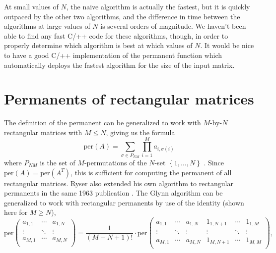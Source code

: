 \documentclass{article}
\begin{document}
At small values of $N$, the naive algorithm is actually the fastest, but it is quickly outpaced by
the other two algorithms, and the difference in time between the algorithms at large values of $N$
is several orders of magnitude. We haven't been able to find any fast C/++ code for these
algorithms, though, in order to properly determine which algorithm is best at which values of $N$.
It would be nice to have a good C/++ implementation of the permanent function which automatically
deploys the fastest algorithm for the size of the input matrix.

\section*{Permanents of rectangular matrices}

The definition of the permanent can be generalized to work with $M$-by-$N$ rectangular
matrices with $M \leq N$, giving us the formula
\begin{equation} \label{eq:rectper1}
    \text{per}(A) = \sum_{\sigma \in P_{NM}}{\prod_{i=1}^M{a_{i,{\sigma(i)}}}}
\end{equation}
where $P_{NM}$ is the set of $M$-permutations of the $N$-set $\left\{1,\dots,N\right\}$
\cite{wiki:permanent}.  Since $\text{per}(A) = \text{per}(A^T)$, this is sufficient for computing
the permanent of all rectangular matrices. Ryser also extended his own algorithm to rectangular
permanents in the same 1963 publication \cite{wiki:computing,ryser1963}.
The Glynn algorithm can be generalized to work with rectangular permanents by use of the
identity (shown here for $M \geq N$),
\begin{equation}
    {\text{per}}\left(
        \begin{matrix}
            a_{1,1} & \cdots & a_{1,N} \\
            \vdots & \ddots & \vdots \\
            a_{M,1} & \cdots & a_{M,N} \\
        \end{matrix}
    \right)
    = \frac{1}{\left(M - N + 1\right)!} \cdot {\text{per}}\left(
        \begin{matrix}
            a_{1,1} & \cdots & a_{1,N} & 1_{1,N+1} & \cdots & 1_{1,M} \\
            \vdots & \ddots & \vdots & \vdots & \ddots & \vdots \\
            a_{M,1} & \cdots & a_{M,N} & 1_{M,N+1} & \cdots & 1_{M,M} \\
        \end{matrix}
    \right),
\end{equation}
\end{document}
